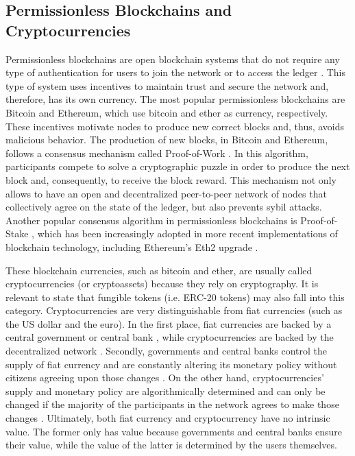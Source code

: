 \documentclass[runningheads]{llncs}
\begin{document}
\subsection{Permissionless Blockchains and Cryptocurrencies} \label{permissionless}
Permissionless blockchains are open blockchain systems that do not require any type of authentication for users to join the network or to access the ledger \cite{survey}. This type of system uses incentives to maintain trust and secure the network and, therefore, has its own currency. The most popular permissionless blockchains are Bitcoin and Ethereum, which use bitcoin \cite{nakamoto_2008} and ether \cite{buterin_2014} as currency, respectively. These incentives motivate nodes to produce new correct blocks and, thus, avoids malicious behavior. The production of new blocks, in Bitcoin and Ethereum, follows a consensus mechanism called Proof-of-Work \cite{nakamoto_2008}. In this algorithm, participants compete to solve a cryptographic puzzle in order to produce the next block and, consequently, to receive the block reward. This mechanism not only allows to have an open and decentralized peer-to-peer network of nodes that collectively agree on the state of the ledger, but also prevents sybil attacks. Another popular consensus algorithm in permissionless blockchains is Proof-of-Stake \cite{buterin_2014}, which has been increasingly adopted in more recent implementations of blockchain technology, including Ethereum's Eth2 upgrade \cite{eth2}.

These blockchain currencies, such as bitcoin and ether, are usually called cryptocurrencies (or cryptoassets) because they rely on cryptography. It is relevant to state that fungible tokens (i.e. ERC-20 tokens) may also fall into this category. Cryptocurrencies are very distinguishable from fiat currencies (such as the US dollar and the euro). In the first place, fiat currencies are backed by a central government or central bank \cite{wikipedia_fiat}, while cryptocurrencies are backed by the decentralized network \cite{wikipedia_crypto}. Secondly, governments and central banks control the supply of fiat currency and are constantly altering its monetary policy without citizens agreeing upon those changes \cite{wikipedia_fiat}. On the other hand, cryptocurrencies' supply and monetary policy are algorithmically determined and can only be changed if the majority of the participants in the network agrees to make those changes \cite{wikipedia_crypto}. Ultimately, both fiat currency and cryptocurrency have no intrinsic value. The former only has value because governments and central banks ensure their value, while the value of the latter is determined by the users themselves.
\end{document}
